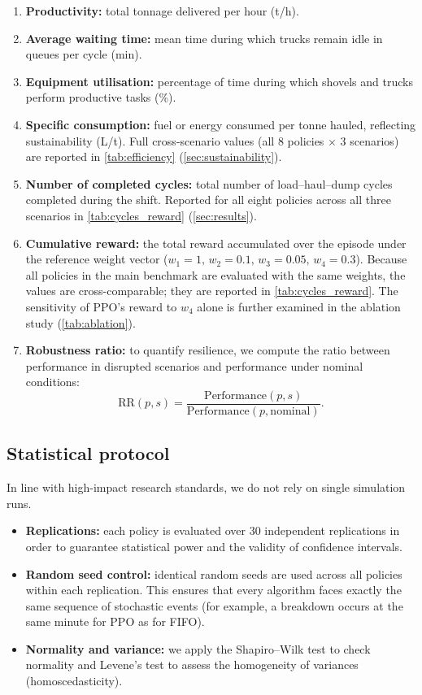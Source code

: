 \documentclass[11pt,a4paper]{article}
\begin{document}
\begin{enumerate}
  \item \textbf{Productivity:} total tonnage delivered per hour (t/h).
  \item \textbf{Average waiting time:} mean time during which trucks remain idle in queues per cycle (min).
  \item \textbf{Equipment utilisation:} percentage of time during which shovels and trucks perform productive tasks (\%).
  \item \textbf{Specific consumption:} fuel or energy consumed per tonne hauled, reflecting sustainability (L/t). Full cross-scenario values (all 8 policies $\times$ 3 scenarios) are reported in \cref{tab:efficiency} (\cref{sec:sustainability}).
  \item \textbf{Number of completed cycles:} total number of load--haul--dump cycles completed during the shift. Reported for all eight policies across all three scenarios in \cref{tab:cycles_reward} (\cref{sec:results}).
  \item \textbf{Cumulative reward:} the total reward accumulated over the episode under the reference weight vector ($w_1=1,\,w_2=0.1,\,w_3=0.05,\,w_4=0.3$). Because all policies in the main benchmark are evaluated with the same weights, the values are cross-comparable; they are reported in \cref{tab:cycles_reward}. The sensitivity of PPO's reward to $w_4$ alone is further examined in the ablation study (\cref{tab:ablation}).
  \item \textbf{Robustness ratio:} to quantify resilience, we compute the ratio between performance in disrupted scenarios and performance under nominal conditions:
  \begin{equation}
  \mathrm{RR}(p,s) = \frac{\mathrm{Performance}(p,s)}{\mathrm{Performance}(p,\mathrm{nominal})} .
  \label{eq:rr}
  \end{equation}
\end{enumerate}

\subsection{Statistical protocol}
\label{sec:proto}

In line with high-impact research standards, we do not rely on single simulation runs.

\begin{itemize}
  \item \textbf{Replications:} each policy is evaluated over 30 independent replications in order to guarantee statistical power and the validity of confidence intervals.
  \item \textbf{Random seed control:} identical random seeds are used across all policies within each replication. This ensures that every algorithm faces exactly the same sequence of stochastic events (for example, a breakdown occurs at the same minute for PPO as for FIFO).
  \item \textbf{Normality and variance:} we apply the Shapiro--Wilk test to check normality and Levene's test to assess the homogeneity of variances (homoscedasticity).
\end{itemize}
\end{document}
